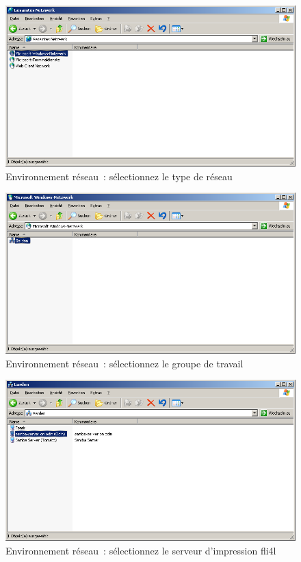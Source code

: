 \begin{figure}[hbt!]
\centering
\includegraphics[width=\columnwidth]{image003}
\caption{Environnement réseau~: sélectionnez le type de réseau}
\label{fig:sambalpd:networking-environment:2}
\end{figure}

\begin{figure}[hbt!]
\centering
\includegraphics[width=\columnwidth]{image004}
\caption{Environnement réseau~: sélectionnez le groupe de travail}
\label{fig:sambalpd:networking-environment:3}
\end{figure}

\begin{figure}[hbt!]
\centering
\includegraphics[width=\columnwidth]{image005}
\caption{Environnement réseau~: sélectionnez le serveur d'impression fli4l}
\label{fig:sambalpd:networking-environment:4}
\end{figure}

